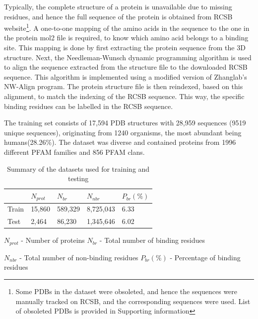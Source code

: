 \documentclass[journal=jacsat,manuscript=article]{achemso}
\begin{document}
Typically, the complete structure of a protein is unavailable due to missing residues, and hence the full sequence of the protein is obtained from RCSB \cite{burley2021rcsb} website\footnote{Some PDBs in the dataset were obsoleted, and hence the sequences were manually tracked on RCSB, and the corresponding sequences were used. List of obsoleted PDBs is provided in Supporting information}. A one-to-one mapping of the amino acids in the sequence to the one in the protein mol2 file is required, to know which amino acid belongs to a binding site. This mapping is done by first extracting the protein sequence from the 3D structure. Next, the Needleman-Wunsch dynamic programming algorithm is used to align the sequence extracted from the structure file to the downloaded RCSB sequence. This algorithm is implemented using a modified version of Zhanglab's NW-Align program\cite{NWAlign}. The protein structure file is then reindexed, based on this alignment, to match the indexing of the RCSB sequence. This way, the specific binding residues can be labelled in the RCSB sequence.


The training set consists of 17,594 PDB structures with 28,959 sequences (9519 unique sequences), originating from 1240 organisms, the most abundant being humans(28.26\%). The dataset was diverse and contained proteins from 1996 different PFAM families and 856 PFAM clans.

\begin{table}
    \centering
    \begin{tabular}{| P{2.75cm} | P{2.75cm} | P{2.75cm} | P{2.75cm} | P{2.75cm} |}
        \hline
              & $N_{prot}$ & $N_{br}$ & $N_{nbr}$ & $P_{br}(\%)$ \\
        \hline
        Train & 15,860     & 589,329  & 8,725,043 & 6.33         \\
        Test  & 2,464      & 86,230   & 1,345,646 & 6.02         \\
        \hline
    \end{tabular}
    \caption{\label{tab:dataset_summary} Summary of the datasets used for training and testing}
    \vspace{5 mm}
    \noindent $N_{prot}$ - Number of proteins \hfill $N_{br}$ - Total number of binding residues

    \vspace{3 mm}

    \noindent $N_{nbr}$ - Total number of non-binding residues \hfill $P_{br}(\%)$ - Percentage of binding residues
\end{table}
\end{document}

